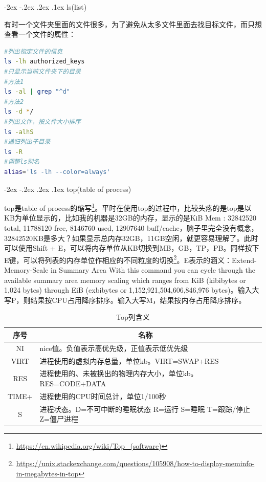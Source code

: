 \documentclass[12pt]{book}
\makeatletter
\numberwithin{dummy}{section}
\theoremstyle{ocrenumbox}
\theoremstyle{blacknumex}
\theoremstyle{blacknumbox}
\theoremstyle{ocrenum}
\renewcommand\paragraph{\@startsection{paragraph}{4}{\z@}
	{-2ex \@plus-.2ex \@minus .2ex}
	{.1ex}
	{\normalfont\small\sffamily\bfseries}}
\makeatother
\begin{document}
\paragraph{ls(list)}

有时一个文件夹里面的文件很多，为了避免从太多文件里面去找目标文件，而只想查看一个文件的属性：

\begin{lstlisting}[language=Bash]
#列出指定文件的信息
ls -lh authorized_keys
#只显示当前文件夹下的目录
#方法1
ls -al | grep "^d"
#方法2
ls -d */
#列出文件，按文件大小排序
ls -alhS
#递归列出子目录
ls -R
#调整ls别名
alias='ls -lh --color=always'
\end{lstlisting}

\paragraph{top(table of process)}

top是table of process的缩写\footnote{\url{https://en.wikipedia.org/wiki/Top_(software)}}。平时在使用top的过程中，比较头疼的是top是以KB为单位显示的，比如我的机器是32GB的内存，显示的是KiB Mem : 32842520 total, 11788120 free,  8146760 used, 12907640 buff/cache，脑子里完全没有概念，32842520KB是多大？如果显示总内存32GB，11GB空闲，就更容易理解了。此时可以使用Shift + E，可以将内存单位从KB切换到MB，GB，TP，PB。同样按下E键，可以将列表的内存单位作相应的不同粒度的切换\footnote{\url{https://unix.stackexchange.com/questions/105908/how-to-display-meminfo-in-megabytes-in-top}}。E表示的涵义：Extend-Memory-Scale in Summary Area With this command you can cycle through the available summary area memory scaling which ranges from KiB (kibibytes or 1,024 bytes) through EiB (exbibytes or 1,152,921,504,606,846,976 bytes)。输入大写P，则结果按CPU占用降序排序。输入大写M，结果按内存占用降序排序。

\begin{table}
	\caption{Top列含义}
	\label{table:topcolumns}
	\begin{center}
	\begin{tabular}{cp{10cm}c}
		\hline
		\multirow{1}{*}{序号}
		& \multicolumn{1}{c}{名称}  \\
		\hline			
		NI & nice值。负值表示高优先级，正值表示低优先级 \\
		\hline	
		VIRT & 进程使用的虚拟内存总量，单位kb。VIRT=SWAP+RES \\
		\hline
		RES & 进程使用的、未被换出的物理内存大小，单位kb。RES=CODE+DATA \\
		\hline
		TIME+ & 进程使用的CPU时间总计，单位1/100秒 \\
		\hline
		S & 进程状态。D=不可中断的睡眠状态 R=运行 S=睡眠 T=跟踪/停止 Z=僵尸进程 \\
		\hline		
	\end{tabular}	
	\end{center}
\end{table}
\end{document}
